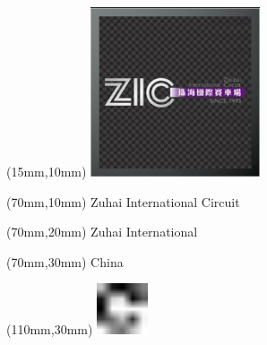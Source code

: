 \null\newpage
\begin{textblock*}{50mm}(15mm,10mm)%
\includegraphics[width=50mm]{LG/2015-05-20_00099.png}
\end{textblock*}
\begin{textblock*}{130mm}(70mm,10mm)%
{\fontsize{20}{20}\selectfont Zuhai International Circuit}\\
\end{textblock*}
\begin{textblock*}{120mm}(70mm,20mm)%
{\fontsize{16}{16}\selectfont Zuhai International}\\
\end{textblock*}
\begin{textblock*}{120mm}(70mm,30mm)%
{\fontsize{12}{12}\selectfont China}
\end{textblock*}
\begin{textblock*}{30mm}(110mm,30mm)%
\centering
\includegraphics[height=15mm]{icons/fa-rotate-right.pdf}
\end{textblock*}
